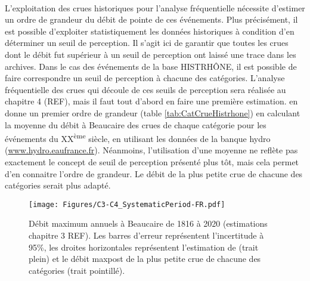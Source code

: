 \documentclass[11pt]{article}
\begin{document}
	\paragraph{} L'exploitation des crues historiques pour l'analyse fréquentielle nécessite d'estimer un ordre de grandeur du débit de pointe de ces événements. Plus précisément, il est possible d'exploiter statistiquement les données historiques à condition d'en déterminer un seuil de perception. Il s'agit ici de garantir que toutes les crues dont le débit fut supérieur à un seuil de perception ont laissé une trace dans les archives. Dans le cas des événements de la base HISTRHÔNE, il est possible de faire correspondre un seuil de perception à chacune des catégories. L'analyse fréquentielle des crues qui découle de ces seuils de perception sera réalisée au chapitre 4 (REF), mais il faut tout d'abord en faire une première estimation. \citet{pichard_hydro-climatology_2017} en donne un premier ordre de grandeur (table \ref{tab:CatCrueHistrhone}) en calculant la moyenne du débit à Beaucaire des crues de chaque catégorie pour les événements du XX\textsuperscript{ème} siècle, en utilisant les données de la banque hydro (\url{www.hydro.eaufrance.fr}). Néanmoins, l'utilisation d'une moyenne ne reflète pas exactement le concept de seuil de perception présenté plus tôt, mais cela permet d'en connaitre l'ordre de grandeur. Le débit de la plus petite crue de chacune des catégories serait plus adapté. 
	
	\begin{figure}[h]
	\centering
		\texttt{[image: Figures/C3-C4\_SystematicPeriod-FR.pdf]}
        \caption{Débit maximum annuels à Beaucaire de 1816 à 2020 (estimations chapitre 3 REF). Les barres d'erreur représentent l'incertitude à 95\%, les droites horizontales représentent l'estimation de \citet{pichard_hydro-climatology_2017} (trait plein) et le débit maxpost de la plus petite crue de chacune des catégories (trait pointillé).}
		\label{fig:C3-C4_Syst}
	\end{figure}
		
	
\end{document}
